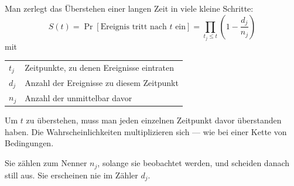 \begin{merksatz}
Man zerlegt das Überstehen einer langen Zeit in viele kleine Schritte:
\[ S(t) = \Pr[\text{Ereignis tritt nach } t \text{ ein}] = \prod_{t_j \le t}\left(1 - \frac{d_j}{n_j}\right) \]
mit
\begin{center}
\renewcommand{\arraystretch}{1.45}
\begin{tabular}{@{}P{1.4cm}P{6.8cm}@{}}
\toprule
$t_j$ & Zeitpunkte, zu denen Ereignisse eintraten\\
$d_j$ & Anzahl der Ereignisse zu diesem Zeitpunkt\\
$n_j$ & Anzahl der  unmittelbar davor\\
\bottomrule
\end{tabular}
\end{center}

Um $t$ zu überstehen, muss man jeden einzelnen Zeitpunkt davor überstanden haben. Die Wahrscheinlichkeiten multiplizieren sich --- wie bei einer Kette von Bedingungen.

Sie zählen zum Nenner $n_j$, solange sie beobachtet werden, und scheiden danach still aus. Sie erscheinen nie im Zähler $d_j$.
\end{merksatz}

